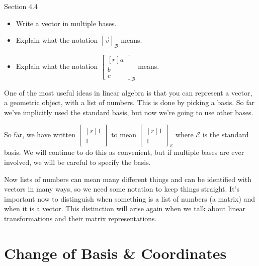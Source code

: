 \documentclass{problemset}
\newcommand{\mat}[1]{\begin{bmatrix*}[r]#1\end{bmatrix*}}
\begin{document}
\begin{lesson}

	Section 4.4

	\begin{itemize}
		\item Write a vector in multiple bases.
		\item Explain what the notation $[\vec v]_{\mathcal B}$ means.
		\item Explain what the notation $\mat{a\\b\\c}_{\mathcal B}$ means.
	\end{itemize}

	One of the most useful ideas in linear algebra is that you can
	represent a vector, a geometric object, with a list of numbers. This
	is done by picking a basis. So far we've implicitly used the standard basis,
	but now we're going to use other bases.

	\begin{annotation}
		\begin{notes}
			So far, we have written $\mat{1\\1}$ to mean
			$\mat{1\\1}_{\mathcal E}$ where $\mathcal E$ is the
			standard basis. We will continue to do this as convenient,
			but if multiple bases are ever involved, we will be careful
			to specify the basis.
		\end{notes}
	\end{annotation}
	Now lists of numbers can mean many different things and can be identified
	with vectors in many ways, so we need some notation to keep things straight.
	It's important now to distinguish when something is a list of numbers (a matrix)
	and when it is a vector. This distinction will arise again when
	we talk about linear transformations and their matrix representations.

\end{lesson}
\section*{Change of Basis \& Coordinates}
\end{document}
